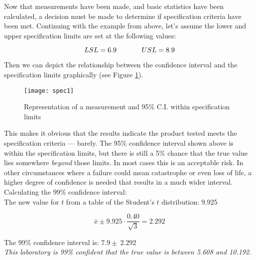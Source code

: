 Now that measurements have been made, and basic statistics have been calculated, a decision must be made to determine if specification criteria have been met.  Continuing with the example from above, let's assume the lower and  upper specification limits are set at the following values:

\begin{center}
\begin{equation}
LSL = 6.9  \hspace{0.5in}  USL = 8.9 
\end{equation}

\end{center}

Then we can depict the relationship between the confidence interval and the specification limits graphically (see Figure \ref{ConfInt}).
\begin{figure}[h]\caption{Representation of a measurement and 95\% C.I. within specification limits}\label{ConfInt}
\begin{center}
\texttt{[image: spec1]}
\end{center}
\end{figure}

This makes it obvious that the results indicate the product tested meets the specification criteria --- barely.  The 95\% confidence interval shown above is within the specification limits, but there is still a 5\% chance that the true value lies somewhere \textit{beyond} those limits.  In most cases this is an acceptable risk. In other circumstances where a failure could mean catastrophe or even loss of life, a higher degree of confidence is needed that results in a much wider interval.\\


Calculating the 99\% confidence interval:\\


The new value for $ t $  from a table of the Student’s $ t $ distribution: 9.925\\

\begin{center}
\begin{equation}
\bar{x} \pm 9.925 \cdot \frac{0.40}{\sqrt{3}}  = 2.292 
\end{equation}
\end{center}

The 99\% confidence interval is: $ 7.9 \pm \ 2.292 $\\


\textit{This laboratory is 99\% confident that the true value is between 5.608 and 10.192.}\\

